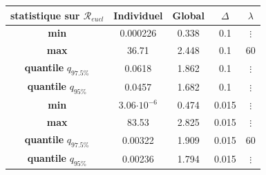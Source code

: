 
\begin{figure}
	\begin{tabularx}{\textwidth}{ccccc}
		\toprule
		statistique sur $\mathcal R_{eucl}$ & \textbf{Individuel} & \textbf{Global} & $\Delta$ & $\lambda$ \\
		\midrule
		\textbf{min}                        & 0.000226            & 0.338           & 0.1      & $\vdots$  \\
		\textbf{max}                        & 36.71               & 2.448           & 0.1      & 60        \\
		\textbf{quantile} $q_{97.5\%}$      & 0.0618              & 1.862           & 0.1      & $\vdots$  \\
		\textbf{quantile} $q_{95\%}$        & 0.0457              & 1.682           & 0.1      & $\vdots$  \\
		\midrule
		\textbf{min}                        & 3.06$\cdot 10^{-6}$ & 0.474           & 0.015    & $\vdots$  \\
		\textbf{max}                        & 83.53               & 2.825           & 0.015    & $\vdots$  \\
		\textbf{quantile} $q_{97.5\%}$      & 0.00322             & 1.909           & 0.015    & 60        \\
		\textbf{quantile} $q_{95\%}$        & 0.00236             & 1.794           & 0.015    & $\vdots$  \\

		\bottomrule
	\end{tabularx}
\end{figure}

